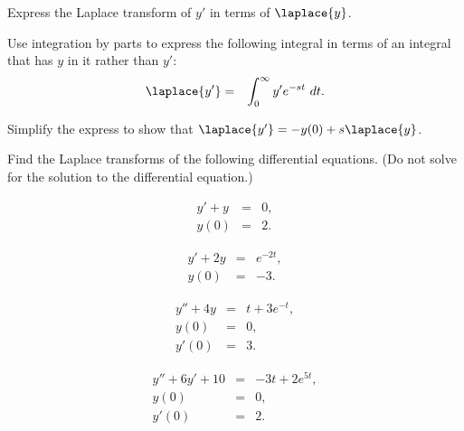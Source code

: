 \begin{problem}
\item Express the Laplace transform of $y'$ in terms of $\laplace{y}$.
  \begin{subproblem}
    \item Use integration by parts to express the following integral
      in terms of an integral that has $y$ in it rather than $y'$:
      \begin{eqnarray*}
        \laplace{y'} & = & \int^\infty_0 y' e^{-st} ~ dt.
      \end{eqnarray*}
      \vfill

    \item Simplify the express to show that $\laplace{y'} = -y(0) + s\laplace{y}$.
      \vfill

  \end{subproblem}


  \clearpage

\item Find the Laplace transforms of the following differential
  equations. (Do not solve for the solution to the differential
  equation.)

  \begin{subproblem}
  \item 
    \begin{eqnarray*}
      y' + y & = & 0, \\
      y(0) & = & 2.
    \end{eqnarray*}
    \vfill

  \item 
    \begin{eqnarray*}
      y' + 2y & = & e^{-2t}, \\
      y(0) & = & -3.
    \end{eqnarray*}
    \vfill

  \item 
    \begin{eqnarray*}
      y'' + 4y & = & t + 3e^{-t}, \\
      y(0) & = & 0, \\
      y'(0) & = & 3.
    \end{eqnarray*}
    \vfill

  \item 
    \begin{eqnarray*}
      y'' + 6y' + 10 & = & -3t + 2e^{5t}, \\
      y(0) & = & 0, \\
      y'(0) & = & 2.
    \end{eqnarray*}
    \vfill


  \end{subproblem}


\end{problem}


